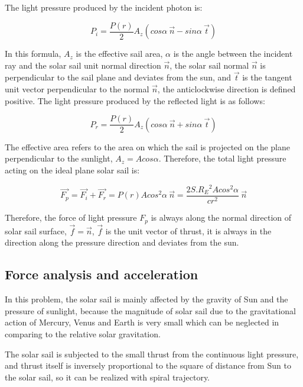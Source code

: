\documentclass[../Paper.tex]{subfiles}
\begin{document}
The light pressure produced by the incident photon is:

\begin{equation}
P_i=\frac{P(r)}{2}A_z(cos\alpha~\vec{n}-sin\alpha~\vec{t})
\label{eq:1}
\end{equation}

In this formula, $A_z$ is the effective sail area, $\alpha$ is the angle between the incident ray and the solar sail unit normal direction $\vec{n}$, the solar sail normal $\vec{n}$ is perpendicular to the sail plane and deviates from the sun, and $\vec{t}$ is the tangent unit vector perpendicular to the normal $\vec{n}$, the anticlockwise direction is defined positive. The light pressure produced by the reflected light is as follows:

\begin{equation}
P_r=\frac{P(r)}{2}A_z(cos\alpha~\vec{n}+sin\alpha~\vec{t})
\label{eq:2}
\end{equation}

The effective area refers to the area on which the sail is projected on the plane perpendicular to the sunlight, $A_z=Acos\alpha$. Therefore, the total light pressure acting on the ideal plane solar sail is:

\begin{equation}	
\vec{F_p}=\vec{F_i}+\vec{F_r}=P(r)Acos^2\alpha~\vec{n}=\dfrac{2S.{R_E}^2Acos^2\alpha}{cr^2}~\vec{n}
\label{eq:3}
\end{equation}

Therefore, the force of light pressure $F_p$ is always along the normal direction of solar sail surface, $\vec{f}=\vec{n}$, $\vec{f}$ is the unit vector of thrust, it is always in the direction along the pressure direction and deviates from the sun.

\subsection{Force analysis and acceleration}

In this problem, the solar sail is mainly affected by the gravity of Sun and the pressure of sunlight, because the magnitude of solar sail due to the gravitational action of Mercury, Venus and Earth is very small which can be neglected in comparing to the relative solar gravitation.

The solar sail is subjected to the small thrust from the continuous light pressure, and thrust itself is inversely proportional to the square of distance from Sun to the solar sail, so it can be realized with spiral trajectory.      
\end{document}
